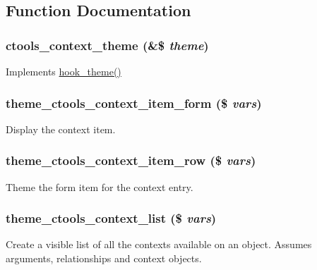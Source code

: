 \subsection{Function Documentation}
\hypertarget{context_8theme_8inc_aee55c917e7b5c7aa1b692648e3e3afeb}{
\subsubsection[{ctools\_\-context\_\-theme}]{\setlength{\rightskip}{0pt plus 5cm}ctools\_\-context\_\-theme (\&\$ {\em theme})}}
\label{context_8theme_8inc_aee55c917e7b5c7aa1b692648e3e3afeb}
Implements \hyperlink{group__hooks_ga013ccb45c7aaab1c16cf9691428c910d}{hook\_\-theme()} \hypertarget{context_8theme_8inc_a398190b6916d7cd66e63a9f5e8ce1692}{
\subsubsection[{theme\_\-ctools\_\-context\_\-item\_\-form}]{\setlength{\rightskip}{0pt plus 5cm}theme\_\-ctools\_\-context\_\-item\_\-form (\$ {\em vars})}}
\label{context_8theme_8inc_a398190b6916d7cd66e63a9f5e8ce1692}
Display the context item. \hypertarget{context_8theme_8inc_a235f6b6bdf1635a0e13580793e5aedf4}{
\subsubsection[{theme\_\-ctools\_\-context\_\-item\_\-row}]{\setlength{\rightskip}{0pt plus 5cm}theme\_\-ctools\_\-context\_\-item\_\-row (\$ {\em vars})}}
\label{context_8theme_8inc_a235f6b6bdf1635a0e13580793e5aedf4}
Theme the form item for the context entry. \hypertarget{context_8theme_8inc_ac1c4694176a4b8f87275932cfd677cb1}{
\subsubsection[{theme\_\-ctools\_\-context\_\-list}]{\setlength{\rightskip}{0pt plus 5cm}theme\_\-ctools\_\-context\_\-list (\$ {\em vars})}}
\label{context_8theme_8inc_ac1c4694176a4b8f87275932cfd677cb1}
Create a visible list of all the contexts available on an object. Assumes arguments, relationships and context objects.


